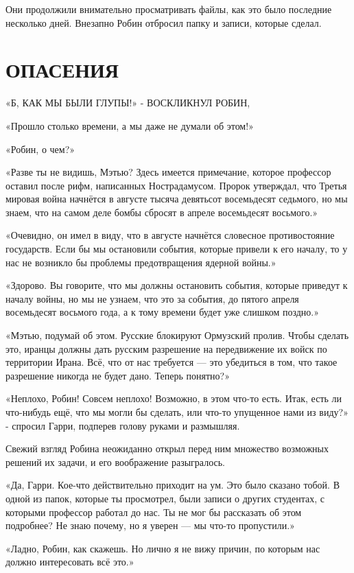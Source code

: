 \documentclass[a5paper, 9pt,
final, openany, twoside=true]{memoir}
\begin{document}
Они продолжили внимательно просматривать файлы, как это было последние несколько дней. Внезапно Робин отбросил папку и записи, которые сделал.
\chapter{ОПАСЕНИЯ}
«Б{, КАК МЫ БЫЛИ ГЛУПЫ!» - ВОСКЛИКНУЛ РОБИН},

«Прошло столько времени, а мы даже не думали об этом!»

«Робин, о чем?»

«Разве ты не видишь, Мэтью? Здесь имеется примечание, которое профессор оставил после рифм, написанных Нострадамусом. Пророк утверждал, что Третья мировая война начнётся в августе тысяча девятьсот восемьдесят седьмого, но мы знаем, что на самом деле бомбы сбросят в апреле восемьдесят восьмого.»

«Очевидно, он имел в виду, что в августе начнётся словесное противостояние государств. Если бы мы остановили события, которые привели к его началу, то у нас не возникло бы проблемы предотвращения ядерной войны.»

«Здорово. Вы говорите, что мы должны остановить события, которые приведут к началу войны, но мы не узнаем, что это за события, до пятого апреля восемьдесят восьмого года, а к тому времени будет уже слишком поздно.»

«Мэтью, подумай об этом. Русские блокируют Ормузский пролив. Чтобы сделать это, иранцы должны дать русским разрешение на передвижение их войск по территории Ирана. Всё, что от нас требуется — это убедиться в том, что такое разрешение никогда не будет дано. Теперь понятно?»

«Неплохо, Робин! Совсем неплохо! Возможно, в этом что-то есть. Итак, есть ли что-нибудь ещё, что мы могли бы сделать, или что-то упущенное нами из виду?» - спросил Гарри, подперев голову руками и размышляя.

Свежий взгляд Робина неожиданно открыл перед ним множество возможных решений их задачи, и его воображение разыгралось.

«Да, Гарри. Кое-что действительно приходит на ум. Это было сказано тобой. В одной из папок, которые ты просмотрел, были записи о других студентах, с которыми профессор работал до нас. Ты не мог бы рассказать об этом подробнее? Не знаю почему, но я уверен — мы что-то пропустили.»

«Ладно, Робин, как скажешь. Но лично я не вижу причин, по которым нас должно интересовать всё это.»
\end{document}
